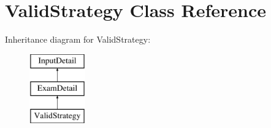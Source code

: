 \hypertarget{classValidStrategy}{\section{Valid\-Strategy Class Reference}
\label{classValidStrategy}
}
Inheritance diagram for Valid\-Strategy\-:\begin{figure}[H]
\begin{center}
\leavevmode
\includegraphics[height=3.000000cm]{classValidStrategy}
\end{center}
\end{figure}
